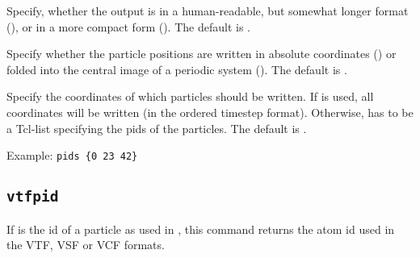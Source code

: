 \begin{arguments}
\item[\opt{<short|verbose>}] Specify, whether the output is in a
  human-readable, but somewhat longer format (), or
  in a more compact form (). The default is
  .
  
\item[\opt{<folded|absolute>}] Specify whether the particle positions
  are written in absolute coordinates () or folded
  into the central image of a periodic system (). The
  default is .
  
\item[\opt{pids <\var{pids}|all>}] Specify the coordinates of which
  particles should be written. If  is used, all
  coordinates will be written (in the ordered timestep format).
  Otherwise,  has to be a Tcl-list specifying the pids of
  the particles. The default is .
  
  Example: \verb!pids {0 23 42}!
  
\end{arguments}

\subsection{\texttt{vtfpid}}

If  is the id of a particle as used in \es, this command
returns the atom id used in the VTF, VSF or VCF formats.


